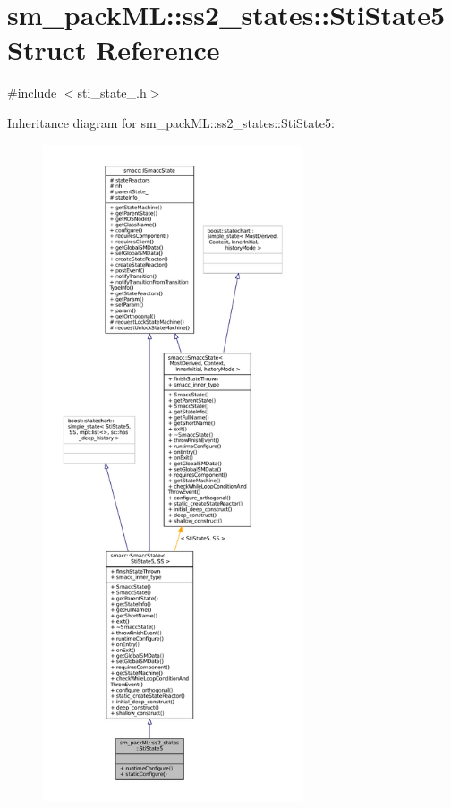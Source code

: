 \hypertarget{structsm__packML_1_1ss2__states_1_1StiState5}{}\section{sm\+\_\+pack\+ML\+:\+:ss2\+\_\+states\+:\+:Sti\+State5 Struct Reference}
\label{structsm__packML_1_1ss2__states_1_1StiState5}


{\ttfamily \#include $<$sti\+\_\+state\+\_.\+h$>$}



Inheritance diagram for sm\+\_\+pack\+ML\+:\+:ss2\+\_\+states\+:\+:Sti\+State5\+:
\nopagebreak
\begin{figure}[H]
\begin{center}
\leavevmode
\includegraphics[height=550pt]{structsm__packML_1_1ss2__states_1_1StiState5__inherit__graph}
\end{center}
\end{figure}



